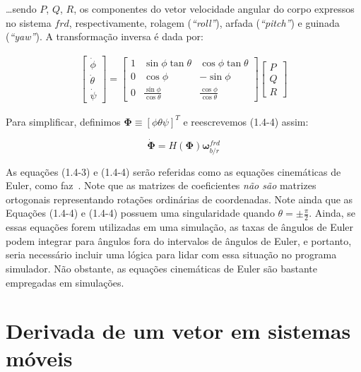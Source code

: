 \ldots sendo \(P\), \(Q\), \(R\), os componentes do vetor velocidade angular do corpo expressos no sistema \(frd\), respectivamente, rolagem (\emph{``roll''}), arfada (\emph{``pitch''}) e guinada (\emph{``yaw''}). A transformação inversa é dada por:

\begin{align} \tag{1.4-4}
    \begin{bmatrix}
        \dot\phi \\
        \dot\theta \\
        \dot\psi
    \end{bmatrix}
    =
    \begin{bmatrix}
        1 & \sin{\phi}\tan{\theta} & \cos{\phi}\tan{\theta} \\
        0 & \cos{\phi} & -\sin{\phi} \\
        0 & \frac{\sin{\phi}}{\cos{\theta}} & \frac{\cos{\phi}}{\cos{\theta}}
    \end{bmatrix}
    \begin{bmatrix}
        P \\ Q \\ R
    \end{bmatrix}
\end{align}

Para simplificar, definimos \(\mathbf{\Phi} \equiv \left[\phi \theta \psi \right]^T \) e reescrevemos  (1.4-4) assim:

\begin{equation} \tag{1.4-5}
    \dot{\mathbf{\Phi}} = H \left( \mathbf{\Phi} \right) \mathbf{\omega}^{frd}_{b/r}
\end{equation}

As equações (1.4-3) e (1.4-4) serão referidas como as equações cinemáticas de Euler, como faz~\cite{Stevens2016}. Note que as matrizes de coeficientes \emph{não são} matrizes ortogonais representando rotações ordinárias de coordenadas. Note ainda que as Equações (1.4-4) e (1.4-4) possuem uma singularidade quando  \(\theta = \pm \frac{\pi}{2}\). Ainda, se essas equações forem utilizadas em uma simulação, as taxas de ângulos de Euler podem integrar para ângulos fora do intervalos de ângulos de Euler, e portanto, seria necessário incluir uma lógica para lidar com essa situação no programa simulador. Não obstante, as equações cinemáticas de Euler são bastante empregadas em simulações.

\section{Derivada de um vetor em sistemas móveis}

